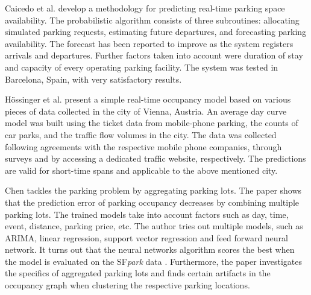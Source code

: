 
Caicedo et al. \cite{caicedo} develop a methodology for predicting real-time parking space availability. The probabilistic algorithm consists of three subroutines: allocating simulated parking requests, estimating future departures, and forecasting parking availability. The forecast has been reported to improve as the system registers arrivals and departures. Further factors taken into account were duration of stay and capacity of every operating parking facility. The system was tested in Barcelona, Spain, with very satisfactory results.

H\"ossinger et al. \cite{hoessinger} present a simple real-time occupancy model based on various pieces of data collected in the city of Vienna, Austria. An average day curve model was built using the ticket data from mobile-phone parking, the counts of car parks, and the traffic flow volumes in the city.  The data was collected following agreements with the respective mobile phone companies, through surveys and by accessing a dedicated traffic website, respectively. The predictions are valid for short-time spans and applicable to the above mentioned city.

Chen \cite{xchen} tackles the parking problem by aggregating parking lots. The paper shows that the prediction  error of parking occupancy decreases by combining multiple parking lots. The trained models take into account factors such as day, time, event, distance, parking price, etc. The author tries out multiple models, such as ARIMA, linear regression, support vector regression and feed forward neural network. It turns out that the neural networks algorithm scores the best when the model is evaluated on the SF\textit{park} data \cite{sfpark_open_data}. Furthermore, the paper investigates the specifics of aggregated parking lots 
and finds certain artifacts in the occupancy graph when clustering the respective parking locations.


